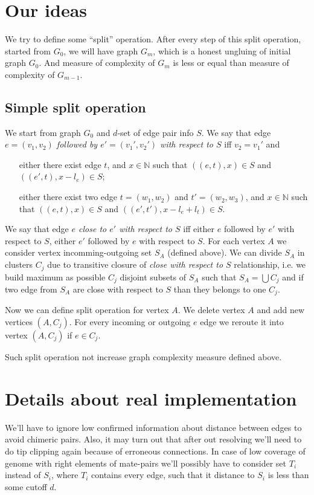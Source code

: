 \documentclass[12pt,a4paper,oneside]{article}
\begin{document}
\section{Our ideas}

We try to define some ``split'' operation. After every step of this split operation, started from $G_0$, we will have graph $G_m$, which is a honest ungluing of initial graph $G_0$. And measure of complexity of $G_m$ is less or equal than measure of complexity of $G_{m-1}$.   

\subsection{Simple split operation}

We start from graph $G_0$ and {$d$-set of edge pair info} $S$.
We say that edge \emph{$e=(v_1, v_2)$ followed by $e'=(v_1', v_2')$ with respect to $S$} iff $v_2 = v_1'$ and 
\begin{itemize}
\item[either ] there exist edge $t$, and $x \in \mathbb{N}  $ such that $((e,t),x) \in S$ and $((e',t),x-l_e)\in S$; 
\item[either ] there exist two edge $t=(w_1,w_2)$ and $t'=(w_2, w_3)$, and $x \in \mathbb{N}$ such that $((e,t),x) \in S$ and $((e',t'),x-l_e+l_t) \in S$. 
\end{itemize}
We say that edge \emph{$e$ close to $e'$ with respect to $S$} iff either $e$ followed by $e'$ with respect to $S$, either $e'$ followed by $e$ with respect to $S$.
For each vertex $A$ we consider vertex incomming-outgoing set $S_A$ (defined above). We can divide $S_A$ in clusters $C_j$ due to transitive closure of \emph{close with respect to $S$} relationship, i.e. we build maximum as possible $C_j$ disjoint subsets of $S_A$ such that $S_A=\bigcup C_j$ and if two edge from $S_A$ are close with respect to $S$ than they belongs to one $C_j$.  

Now we can define split operation for vertex $A$. We delete vertex $A$ and add new vertices $(A, C_j)$. For every incoming or outgoing $e$ edge we reroute it into vertex $(A, C_j)$ if $e\in C_j$. 



Such split operation not increase graph complexity measure defined above. 

\section{Details about real implementation}
We'll have to ignore low confirmed information about distance between edges to avoid chimeric pairs. Also, it may turn out that after out resolving we'll need to do tip clipping again because of erroneous connections.
In case of low coverage of genome with right elements of mate-pairs we'll possibly have to consider set $T_i$ instead of $S_i$, where $T_i$ contains every edge, such that it distance to $S_i$ is less than some cutoff $d$.
\end{document}
